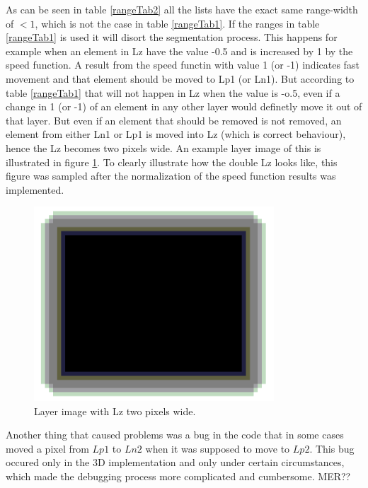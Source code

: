 As can be seen in table \ref{rangeTab2} all the lists have the exact same range-width of $<1$, which is not the case in table \ref{rangeTab1}. If the ranges in table \ref{rangeTab1} is used it will disort the segmentation process. This happens for example when an element in Lz have the value -0.5 and is increased by 1 by the speed function. A result from the speed functin with value 1 (or -1) indicates fast movement and that element should be moved to Lp1 (or Ln1). But according to table \ref{rangeTab1} that will not happen in Lz when the value is -o.5, even if a change in 1 (or -1) of an element in any other layer would definetly move it out of that layer. But even if an element that should be removed is not removed, an element from either Ln1 or Lp1 is moved into Lz (which is correct behaviour), hence the Lz becomes two pixels wide. An example layer image of this is illustrated in figure \ref{doubleLzLayer}. To clearly illustrate how the double Lz looks like, this figure was sampled after the normalization of the speed function results was implemented.
\begin{figure}[h!]
\centering
\includegraphics[width=0.80\textwidth]{implemented/doubleLzLayer}
\caption{Layer image with Lz two pixels wide.}
\label{doubleLzLayer}
\end{figure}

Another thing that caused problems was a bug in the code that in some cases moved a pixel from $Lp1$ to $Ln2$ when it was supposed to move to $Lp2$. This bug occured only in the 3D implementation and only under certain circumstances, which made the debugging process more complicated and cumbersome. MER??


